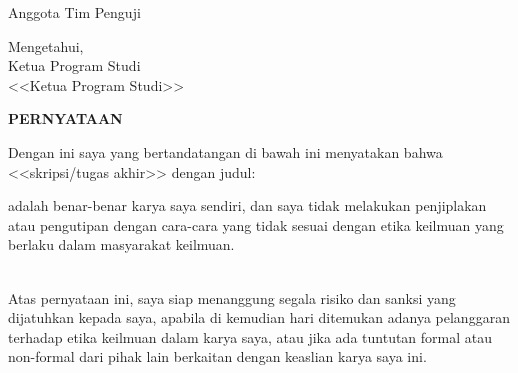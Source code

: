 \documentclass[11pt,a4paper,twoside,openright,notitlepage]{report}
\newcommand{\rtext}[1]{{\color{red} \small #1}}%
\newcommand{\vstaINA}{\rtext{<<SKRIPSI/TUGAS AKHIR>>}}
\newcommand{\vkaprodi}{\rtext{<<Ketua Program Studi>>}}
\begin{document}
{{{\begin{center}
{{\begin{center}
								\begin{minipage}[b]{0.475\textwidth}
									\begin{center}Anggota Tim Penguji \\ \vspace{2.5cm} \vpengii\end{center} 
								\end{minipage} 
							\end{center}
							\vspace{0.75cm}
							\begin{center} 
								Mengetahui,\\ \vspace{0.5cm}	
								Ketua Program Studi \\ \vspace{2.5cm} \vkaprodi
							\end{center}
					}}			 
				\end{center}
				\cleardoublepage 
				
				\vspace*{4cm}
				\begin{center} 
					{\Large \textbf{PERNYATAAN}\\} \vspace{1cm}
				\end{center}
				{\noindent Dengan ini saya yang bertandatangan di bawah ini menyatakan bahwa \MakeLowercase{\vstaINA} dengan judul:  \vspace{0.5cm}
					\begin{center} {\large \textbf{\vjudulINA}}\end{center}
					\vspace{0.5cm}
					adalah benar-benar karya saya sendiri, dan saya tidak melakukan penjiplakan atau pengutipan dengan cara-cara yang tidak sesuai dengan etika keilmuan yang berlaku dalam masyarakat keilmuan.}
				\vspace{0pt}\\
				{\noindent			
					Atas pernyataan ini, saya siap menanggung segala risiko dan sanksi yang dijatuhkan kepada saya, apabila di kemudian hari ditemukan adanya pelanggaran terhadap etika keilmuan dalam karya saya, atau jika ada tuntutan formal atau non-formal dari pihak lain berkaitan dengan keaslian karya saya ini.\\}
				\vspace{0.25cm}
				
}}}
\end{document}
